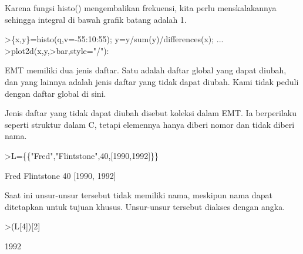 \documentclass[a4paper,10pt]{article}
\begin{document}
\begin{eulernotebook}
\begin{eulercomment}
\begin{eulercomment}
\begin{eulercomment}
\begin{eulercomment}
\begin{eulercomment}
\begin{eulercomment}
\begin{eulercomment}
\begin{eulercomment}
\begin{eulercomment}
\begin{eulercomment}
\begin{eulercomment}
\begin{eulercomment}
\begin{eulercomment}
\begin{eulercomment}
\begin{eulercomment}
\begin{eulercomment}
\begin{eulercomment}
\begin{eulercomment}
\begin{eulercomment}
\begin{eulercomment}
\begin{eulercomment}
\begin{eulercomment}
\begin{eulercomment}
\begin{eulercomment}
\begin{eulercomment}
\begin{eulercomment}
\begin{eulercomment}
\begin{eulercomment}
\begin{eulercomment}
\begin{eulercomment}
\begin{eulercomment}
\begin{eulercomment}
\begin{eulercomment}
\begin{eulercomment}
\begin{eulercomment}
Karena fungsi histo() mengembalikan frekuensi, kita perlu
menskalakannya sehingga integral di bawah grafik batang adalah 1.
\end{eulercomment}
\begin{eulerprompt}
>\{x,y\}=histo(q,v=-55:10:55); y=y/sum(y)/differences(x); ...
>plot2d(x,y,>bar,style="/"):
\end{eulerprompt}
\begin{eulercomment}
EMT memiliki dua jenis daftar. Satu adalah daftar global yang dapat
diubah, dan yang lainnya adalah jenis daftar yang tidak dapat diubah.
Kami tidak peduli dengan daftar global di sini.

Jenis daftar yang tidak dapat diubah disebut koleksi dalam EMT. Ia
berperilaku seperti struktur dalam C, tetapi elemennya hanya diberi
nomor dan tidak diberi nama.
\end{eulercomment}
\begin{eulerprompt}
>L=\{\{"Fred","Flintstone",40,[1990,1992]\}\}
\end{eulerprompt}
\begin{euleroutput}
  Fred
  Flintstone
  40
  [1990,  1992]
\end{euleroutput}
\begin{eulercomment}
Saat ini unsur-unsur tersebut tidak memiliki nama, meskipun nama dapat
ditetapkan untuk tujuan khusus. Unsur-unsur tersebut diakses dengan
angka.
\end{eulercomment}
\begin{eulerprompt}
>(L[4])[2]
\end{eulerprompt}
\begin{euleroutput}
  1992
\end{euleroutput}
\begin{eulercomment}
\begin{eulercomment}

\end{eulercomment}
\end{eulercomment}
\end{eulercomment}
\end{eulercomment}
\end{eulercomment}
\end{eulercomment}
\end{eulercomment}
\end{eulercomment}
\end{eulercomment}
\end{eulercomment}
\end{eulercomment}
\end{eulercomment}
\end{eulercomment}
\end{eulercomment}
\end{eulercomment}
\end{eulercomment}
\end{eulercomment}
\end{eulercomment}
\end{eulercomment}
\end{eulercomment}
\end{eulercomment}
\end{eulercomment}
\end{eulercomment}
\end{eulercomment}
\end{eulercomment}
\end{eulercomment}
\end{eulercomment}
\end{eulercomment}
\end{eulercomment}
\end{eulercomment}
\end{eulercomment}
\end{eulercomment}
\end{eulercomment}
\end{eulercomment}
\end{eulercomment}
\end{eulercomment}
\end{eulernotebook}
\end{document}
